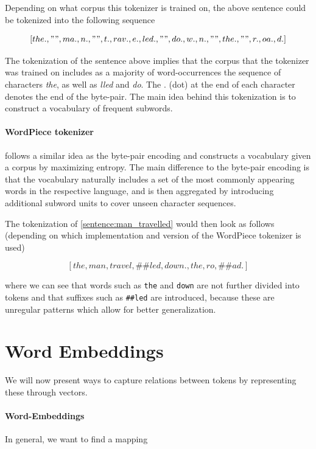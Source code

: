 \documentclass[a4paper,12pt,twoside,openright]{report}
\begin{document}
Depending on what corpus this tokenizer is trained on, the above sentence could be tokenized into the following sequence

$$
[the., " ", ma., n., " ", t., rav., e., led., " ", do., w., n., " ", the., " ", r., oa., d.]
$$

The tokenization of the sentence above implies that the corpus that the tokenizer was trained on includes as a majority of word-occurrences the sequence of characters \textit{the}, as well as \textit{lled} and \textit{do}. 
The $.$ (dot) at the end of each character denotes the end of the byte-pair.
The main idea behind this tokenization is to construct a vocabulary of frequent subwords.

\paragraph{WordPiece tokenizer} \cite{wu16} follows a similar idea as the byte-pair encoding and constructs a vocabulary given a corpus by maximizing entropy.
The main difference to the byte-pair encoding is that the vocabulary naturally includes a set of the most commonly appearing words in the respective language, and is then aggregated by introducing additional subword units to cover unseen character sequences.

The tokenization of \ref{sentence:man_travelled} would then look as follows (depending on which implementation and version of the WordPiece tokenizer is used)

$$
[the, man, travel, \#\#led, down., the, ro,  \#\#ad.]
$$

where we can see that words such as \Verb#the# and \Verb#down# are not further divided into tokens and that suffixes such as \Verb!##led! are introduced, because these are unregular patterns which allow for better generalization.






\section{Word Embeddings}

We will now present ways to capture relations between tokens by representing these through vectors.

\paragraph{Word-Embeddings}
In general, we want to find a mapping 
\end{document}
